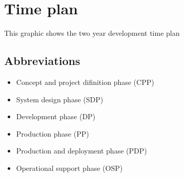\documentclass[Main]{subfiles}
\begin{document}
\chapter{Time plan}

This graphic shows the two year development time plan


\section{Abbreviations}
\begin{itemize}
  \item Concept and project difinition phase (CPP)
  \item System design phase (SDP)
  \item Development phase (DP)
  \item Production phase (PP)
  \item Production and deployment phase (PDP)
  \item Operational support phase (OSP)
\end{itemize}
\end{document}
